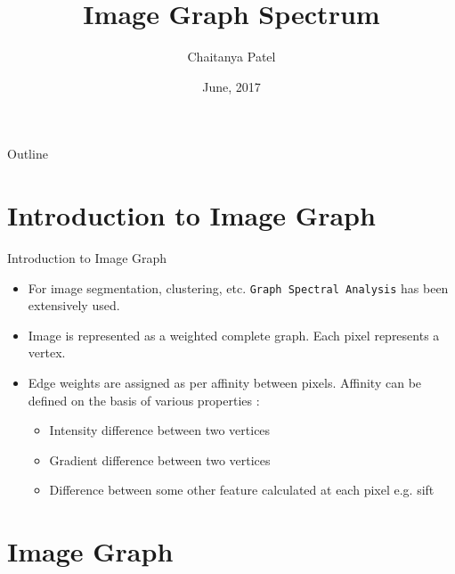 \documentclass{beamer}
\title[Image Graph Spectrum]{Image Graph Spectrum}
\author{Chaitanya Patel}
\institute{CVIT, IIIT-Hyderabad}
\date{June, 2017}
\begin{document}
\begin{frame}
  \titlepage
\end{frame}

\begin{frame}{Outline}
  \tableofcontents
\end{frame}


\section{Introduction to Image Graph}

\begin{frame}{Introduction to Image Graph}

\begin{itemize}
  \item For image segmentation, clustering, etc. \texttt{Graph Spectral Analysis} has been extensively used.
  \item Image is represented as a weighted complete graph. Each pixel represents a vertex.
  \item Edge weights are assigned as per affinity between pixels. Affinity can be defined on the basis of various properties :
  \begin{itemize}
  	\item Intensity difference between two vertices
    \item Gradient difference between two vertices
    \item Difference between some other feature calculated at each pixel e.g. sift
  \end{itemize}

\end{itemize}


\end{frame}



\section{Image Graph}
\end{document}
